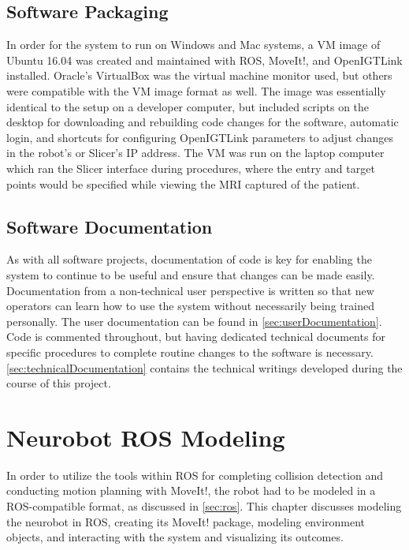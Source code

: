\documentclass[12pt]{report}
\begin{document}
\section{Software Packaging}
In order for the system to run on Windows and Mac systems, a VM image of Ubuntu 16.04 was created and maintained with ROS, MoveIt!, and OpenIGTLink installed. Oracle's VirtualBox was the virtual machine monitor used, but others were compatible with the VM image format as well. The image was essentially identical to the setup on a developer computer, but included scripts on the desktop for downloading and rebuilding code changes for the software, automatic login, and shortcuts for configuring OpenIGTLink parameters to adjust changes in the robot's or Slicer's IP address. The VM was run on the laptop computer which ran the Slicer interface during procedures, where the entry and target points would be specified while viewing the MRI captured of the patient.


\section{Software Documentation}
As with all software projects, documentation of code is key for enabling the system to continue to be useful and ensure that changes can be made easily. Documentation from a non-technical user perspective is written so that new operators can learn how to use the system without necessarily being trained personally. The user documentation can be found in \autoref{sec:userDocumentation}. Code is commented throughout, but having dedicated technical documents for specific procedures to complete routine changes to the software is necessary. \autoref{sec:technicalDocumentation} contains the technical writings developed during the course of this project.


\chapter{Neurobot ROS Modeling}
In order to utilize the tools within ROS for completing collision detection and conducting motion planning with MoveIt!, the robot had to be modeled in a ROS-compatible format, as discussed in \autoref{sec:ros}. This chapter discusses modeling the neurobot in ROS, creating its MoveIt! package, modeling environment objects, and interacting with the system and visualizing its outcomes.
\end{document}
